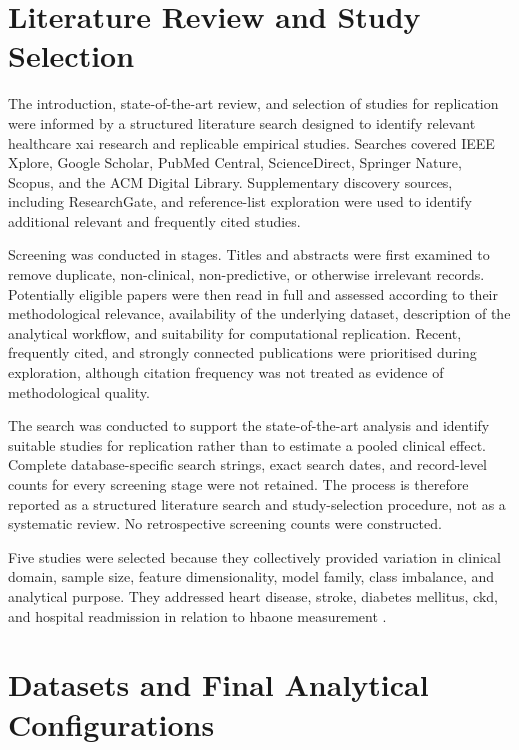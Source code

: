 \section{Literature Review and Study Selection}

The introduction, state-of-the-art review, and selection of studies for replication were informed by a structured literature search designed to identify relevant healthcare \gls{xai} research and replicable empirical studies. Searches covered IEEE Xplore, Google Scholar, PubMed Central, ScienceDirect, Springer Nature, Scopus, and the ACM Digital Library. Supplementary discovery sources, including ResearchGate, and reference-list exploration were used to identify additional relevant and frequently cited studies.

Screening was conducted in stages. Titles and abstracts were first examined to remove duplicate, non-clinical, non-predictive, or otherwise irrelevant records. Potentially eligible papers were then read in full and assessed according to their methodological relevance, availability of the underlying dataset, description of the analytical workflow, and suitability for computational replication. Recent, frequently cited, and strongly connected publications were prioritised during exploration, although citation frequency was not treated as evidence of methodological quality.

The search was conducted to support the state-of-the-art analysis and identify suitable studies for replication rather than to estimate a pooled clinical effect. Complete database-specific search strings, exact search dates, and record-level counts for every screening stage were not retained. The process is therefore reported as a structured literature search and study-selection procedure, not as a systematic review. No retrospective screening counts were constructed.

Five studies were selected because they collectively provided variation in clinical domain, sample size, feature dimensionality, model family, class imbalance, and analytical purpose. They addressed heart disease, stroke, diabetes mellitus, \gls{ckd}, and hospital readmission in relation to \gls{hbaone} measurement \citep{khanna_comparative_2015, wu_machine_2024, chang_pima_2023, santhiya_chronic_2024, strack_impact_2014}.


\section{Datasets and Final Analytical Configurations}

